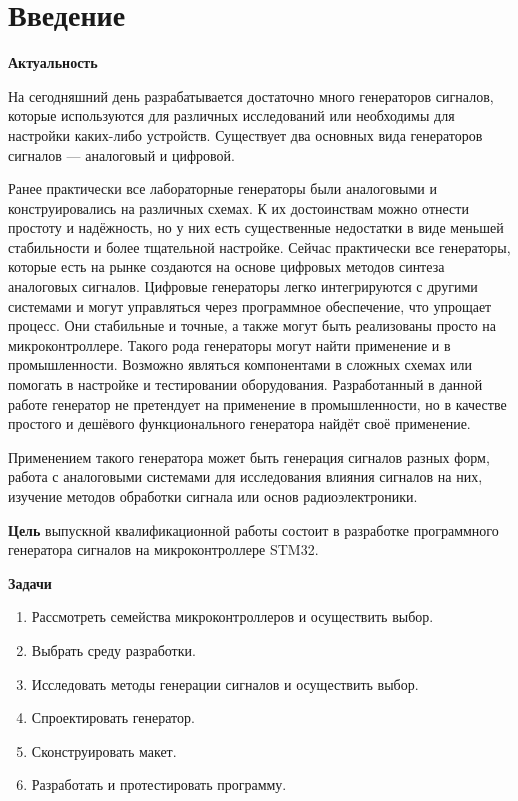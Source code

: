\chapter*{Введение}

\textbf{Актуальность}

	На сегодняшний день разрабатывается достаточно много генераторов сигналов, которые используются для различных исследований или необходимы для настройки каких-либо устройств. Существует два основных вида генераторов сигналов --- аналоговый и цифровой.
	
	Ранее практически все лабораторные генераторы были аналоговыми и конструировались на различных схемах. К их достоинствам можно отнести простоту и надёжность, но у них есть существенные недостатки в виде меньшей стабильности и более тщательной настройке. Сейчас практически все генераторы, которые есть на рынке создаются на основе цифровых методов синтеза аналоговых сигналов. Цифровые генераторы легко интегрируются с другими системами и могут управляться через программное обеспечение, что упрощает процесс. Они стабильные и точные, а также могут быть реализованы просто на микроконтроллере. Такого рода генераторы могут найти применение и в промышленности. Возможно являться компонентами в сложных схемах или помогать в настройке и тестировании оборудования. Разработанный в данной работе генератор не претендует на применение в промышленности, но в качестве простого и дешёвого функционального генератора найдёт своё применение.
	
	Применением такого генератора может быть генерация сигналов разных форм, работа с аналоговыми системами для исследования влияния сигналов на них, изучение методов обработки сигнала или основ радиоэлектроники. 
	
\textbf{Цель}
выпускной квалификационной работы состоит в разработке программного генератора сигналов на микроконтроллере STM32.

\textbf{Задачи}

\begin{enumerate}
\item Рассмотреть семейства микроконтроллеров и осуществить выбор.
\item Выбрать среду разработки.
\item Исследовать методы генерации сигналов и осуществить выбор.
\item Спроектировать генератор.
\item Сконструировать макет.
\item Разработать и протестировать программу.
\end{enumerate}

